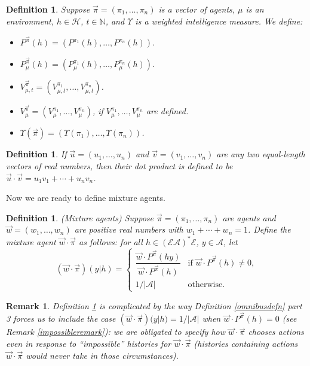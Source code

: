 \documentclass[twoside]{article}
\newtheorem{definition}[theorem]{Definition}
\newtheorem{remark}[theorem]{Remark}
\begin{document}
\begin{definition}
\label{vectorizationdefn}
    Suppose $\vec\pi=(\pi_1,\ldots,\pi_n)$ is a vector of agents, $\mu$ is an environment,
    $h\in\mathcal H$, $t\in\mathbb N$, and $\Upsilon$ is a weighted
    intelligence measure. We define:
    \begin{itemize}
        \item ${P^{\vec\pi}}(h)=(P^{\pi_1}(h),\ldots,P^{\pi_n}(h))$.
        \item $P^{\vec\pi}_\mu(h)=(P^{\pi_1}_\mu(h),\ldots,P^{\pi_n}_\mu(h))$.
        \item $V^{\vec\pi}_{\mu,t}=(V^{\pi_1}_{\mu,t},\ldots,V^{\pi_n}_{\mu,t})$.
        \item $V^{\vec\pi}_\mu=(V^{\pi_1}_\mu,\ldots,V^{\pi_n}_\mu)$,
            if $V^{\pi_1}_\mu,\ldots,V^{\pi_n}_\mu$ are defined.
        \item $\Upsilon(\vec\pi)=(\Upsilon(\pi_1),\ldots,\Upsilon(\pi_n))$.
    \end{itemize}
\end{definition}

\begin{definition}
\label{dotproductdefn}
    If $\vec u=(u_1,\ldots,u_n)$ and
    $\vec v=(v_1,\ldots,v_n)$ are any two equal-length
    vectors of real numbers, then their \emph{dot product}
    is defined to be $\vec u\cdot \vec v=u_1v_1+\cdots+u_nv_n$.
\end{definition}

Now we are ready to define mixture agents.

\begin{definition}
\label{maindefn}
    (Mixture agents)
    Suppose $\vec\pi=(\pi_1,\ldots,\pi_n)$ are agents and $\vec w=(w_1,\ldots,w_n)$
    are positive real numbers with $w_1+\cdots+w_n=1$.
    Define the \emph{mixture agent} $\vec w\cdot\vec\pi$ as follows: for all
    $h\in (\mathcal E\mathcal A)^*\mathcal E$, $y\in\mathcal A$, let
    \[
        (\vec w\cdot\vec\pi)(y|h)
        =
        \begin{cases}
            \dfrac{\vec w\cdot {P^{\vec\pi}}(hy)}{\vec w\cdot {P^{\vec\pi}}(h)}
            &\mbox{if $\vec w\cdot {P^{\vec\pi}}(h)\not=0$,}\\
            1/|\mathcal{A}| &\mbox{otherwise.}
        \end{cases}
    \]
\end{definition}

\begin{remark}
    Definition \ref{maindefn} is complicated by the way
    Definition \ref{omnibusdefn} part 3
    forces us to include the case
    $(\vec w\cdot\vec\pi)(y|h)=1/|\mathcal A|$ when
    $\vec w\cdot {P^{\vec\pi}}(h)=0$
    (see Remark \ref{impossibleremark}): we are obligated to specify how
    $\vec w\cdot\vec\pi$ chooses actions even in response to ``impossible''
    histories for $\vec w\cdot\vec\pi$ (histories containing actions
    $\vec w\cdot\vec\pi$ would never take in those circumstances).
\end{remark}
\end{document}
